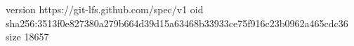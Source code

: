 version https://git-lfs.github.com/spec/v1
oid sha256:3513f0e827380a279b664d39d15a63468b33933ce75f916c23b0962a465cdc36
size 18657

